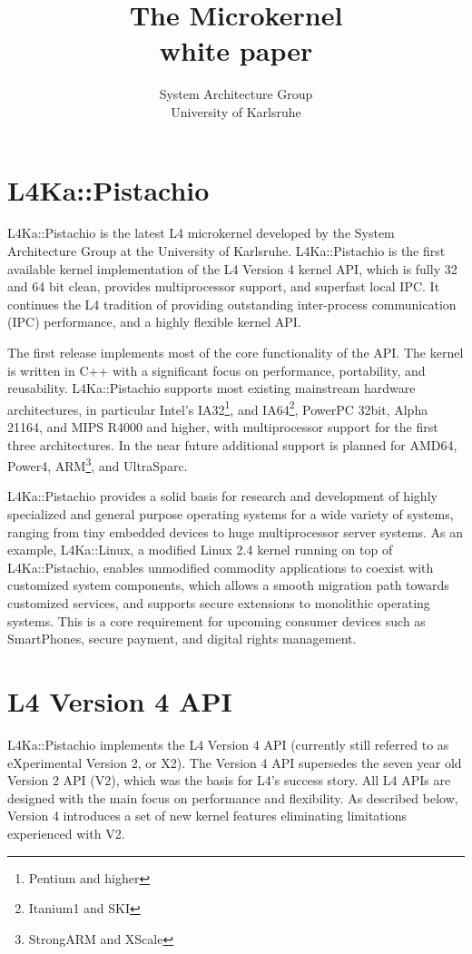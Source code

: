 \documentclass[twoside]{whitepaper}
\title{{\Huge The \Pistachio Microkernel}\\white paper}
\author{System Architecture Group\\University of Karlsruhe}
\newcommand{\Pistachio}{L4Ka::Pistachio\xspace}
\newcommand{\Lx}{L4Ka::Linux\xspace}
\begin{document}
\sffamily
\maketitle

\section{\Pistachio}

\Pistachio is the latest L4 microkernel developed by the System
Architecture Group at the University of Karlsruhe.  \Pistachio is the
first available kernel implementation of the L4 Version 4 kernel API,
which is fully 32 and 64 bit clean, provides multiprocessor support,
and superfast local IPC.  It continues the L4 tradition of providing
outstanding inter-process communication (IPC) performance, and a 
highly flexible kernel API.

The first release implements most of the core
functionality of the API.  The kernel is written in C++ with a
significant focus on performance, portability, and reusability.
\Pistachio supports most existing mainstream hardware architectures,
in particular Intel's IA32\footnote{Pentium and higher}, and
IA64\footnote{Itanium1 and SKI}, PowerPC 32bit, Alpha 21164, and MIPS
R4000 and higher, with multiprocessor support for the first three
architectures.  In the near future additional support is planned for
AMD64, Power4, ARM\footnote{StrongARM and XScale}, and UltraSparc.

\Pistachio provides a solid basis for research and development of
highly specialized and general purpose operating systems for a wide
variety of systems, ranging from tiny embedded devices to huge
multiprocessor server systems.  As an example, \Lx, a modified Linux 2.4 kernel running on top of \Pistachio,
enables unmodified commodity applications to coexist with customized 
system components, which allows a smooth migration path towards customized
services, and supports secure extensions to monolithic operating systems.  
This is a core requirement for upcoming consumer devices such as
SmartPhones, secure payment, and digital rights management.


\section{L4 Version 4 API}
\Pistachio implements the L4 Version 4 API (currently still referred to
as eXperimental Version 2, or X2).  The Version 4 API supersedes the
seven year old Version 2 API (V2), which was the basis for L4's success
story.  All L4 APIs are designed with the main focus on performance
and flexibility.  As described below, Version 4 introduces a set of
new kernel features eliminating limitations experienced with V2.
\end{document}
